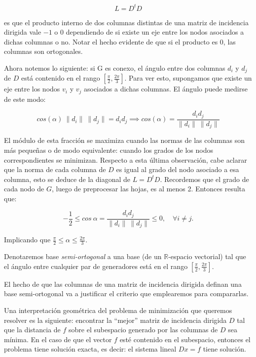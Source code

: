 \documentclass[conference,compsoc,a4paper]{IEEEtran}
\begin{document}
$$L = D^t D$$

\noindent es que el producto interno de dos columnas distintas de una matriz de 
incidencia dirigida vale $-1$ o $0$ dependiendo de si existe un eje 
entre los nodos asociados a dichas columnas o no. Notar el hecho 
evidente de que si el producto es $0$, las columnas son
 ortogonales.

\smallskip

Ahora notemos lo siguiente: si G es conexo, el ángulo entre dos 
columnas $d_i$ y $d_j$ de $D$ está contenido en el rango 
$[\frac{\pi}{2},\frac{2\pi}{3}]$. Para ver esto, supongamos que existe 
un eje entre los nodos $v_i$ y $v_j$ asociados a dichas columnas. 
El ángulo puede medirse de este modo:

$$cos(\alpha) \ \|d_i\| \ \|d_j\|= d_i  d_j \implies cos(\alpha) = 
\frac{d_i d_j}{\|d_i\| \ \|d_j\|}$$

El módulo de esta fracción se maximiza cuando las normas de las 
columnas son más pequeñas o de modo equivalente: cuando los grados de 
los nodos correspondientes se minimizan. Respecto a esta última 
observación, cabe aclarar que la norma de cada columna de $D$ es igual 
al grado del nodo asociado a esa columna, esto se deduce de la diagonal 
de $L = D^t D$. Recordemos que el grado de cada nodo de  $G$, luego de 
preprocesar las hojas, es al menos 2. Entonces resulta que:

$$-\frac{1}{2}\le cos \ \alpha = \frac{d_i d_j}{\|d_i\| \ \|d_j\|} \le 0,\quad \forall i\neq j.$$

\smallskip

\noindent Implicando que $\frac{\pi}{2}\le\alpha \leq \frac{2\pi}{3}$.

\smallskip

Denotaremos base \textit{semi-ortogonal} a una base (de un 
$\mathbb{R}$-espacio vectorial) tal que el ángulo entre cualquier par de 
generadores está en el rango $[\frac{\pi}{2},\frac{2\pi}{3}]$.

\smallskip

El hecho de que las columnas de una matriz de incidencia dirigida 
definan una base semi-ortogonal va a justificar el criterio que 
emplearemos para compararlas.

\bigskip


Una interpretación geométrica del problema de minimización que queremos 
resolver es la siguiente: encontrar la ``mejor'' matriz de incidencia 
dirigida $D$ tal que la distancia de $f$ sobre el subespacio 
generado por las columnas de $D$ sea mínima. En el caso de que 
el vector $f$ esté contenido en el subespacio, entonces el problema 
tiene solución exacta, es decir: el sistema lineal $Dx = f$ tiene 
solución.
\end{document}
